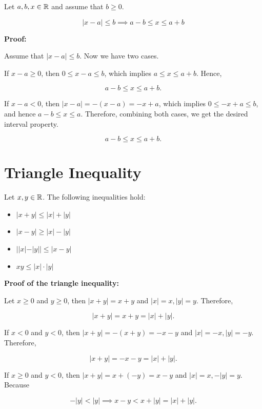 Let \(a, b, x \in \mathbb{R}\) and assume that \(b \ge 0\).

\[
	|x - a| \le b \implies a - b \le x \le a + b
\]

\textbf{Proof:}

Assume that \(|x - a| \le b\). Now we have two cases.

If \(x - a \ge 0\), then \(0 \le x - a \le b\), which implies \(a \le x \le a + b\). Hence,

\[
	a - b \le x \le a + b.
\]

If \(x - a < 0\), then \(|x - a| = -(x - a) = -x + a\), which implies \(0 \le -x + a \le b\), and hence \(a - b \le x \le a\). Therefore, combining both cases, we get the desired interval property.

\[
	a - b \le x \le a + b.
\]

\QED

\section{Triangle Inequality}

Let \(x, y \in \mathbb{R}\). The following inequalities hold:

\begin{itemize}

	\item \(|x + y| \le |x| + |y|\)

	\item \(|x - y| \ge |x| - |y|\)

	\item \(||x| - |y|| \le |x - y|\)

	\item \(xy \le |x| \cdot |y|\)

\end{itemize}

\textbf{Proof of the triangle inequality:}

Let \(x \ge 0\) and \(y \ge 0\), then \(|x + y| = x + y\) and \(|x| = x, |y| = y\). Therefore,

\[
	|x + y| = x + y = |x| + |y|.
\]

If \(x < 0\) and \(y < 0\), then \(|x + y| = -(x + y) = -x - y\) and \(|x| = -x, |y| = -y\). Therefore,

\[
	|x + y| = -x - y = |x| + |y|.
\]

If \(x \ge 0\) and \(y < 0\), then \(|x + y| = x + (-y) = x - y\) and \(|x| = x, -|y| = y\). Because

\[
	-|y| < |y| \implies x - y < x + |y| = |x| + |y|.
\]

